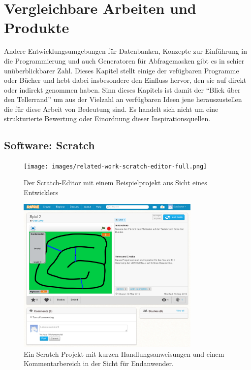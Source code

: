 \section{Vergleichbare Arbeiten und Produkte}
\label{sec:related-work}

Andere Entwicklungsumgebungen für Datenbanken, Konzepte zur Einführung in die Programmierung und auch Generatoren für Abfragemasken gibt es in schier unüberblickbarer Zahl. Dieses Kapitel stellt einige der vefügbaren Programme oder Bücher und hebt dabei insbesondere den Einfluss hervor, den sie auf \idename direkt oder indirekt genommen haben. Sinn dieses Kapitels ist damit der "`Blick über den Tellerrand"' um aus der Vielzahl an verfügbaren Ideen jene herauszustellen die für diese Arbeit von Bedeutung sind. Es handelt sich nicht um eine strukturierte Bewertung oder Einordnung dieser Inspirationsquellen.

\newpage

\subsection{Software: Scratch}

\begin{figure}[p]
  \centering \texttt{[image: images/related-work-scratch-editor-full.png]}
  \caption{Der Scratch-Editor mit einem Beispielprojekt aus Sicht eines Entwicklers}
  \label{fig:scratch-editor-full}
\end{figure}

\begin{figure}[p]
  \centering \includegraphics[width=0.8\textwidth]{images/related-work-scratch-project-full.png}
  \caption{Ein Scratch Projekt mit kurzen Handlungsanweisungen und einem Kommentarbereich in der Sicht für Endanwender.}
  \label{fig:scratch-enduser-full}
\end{figure}

